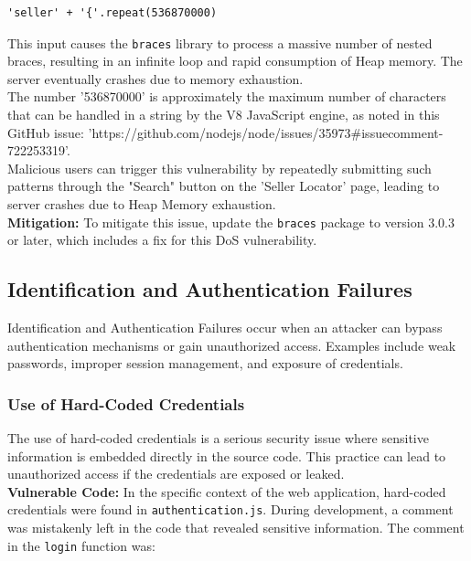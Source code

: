\documentclass[]{article}
\begin{document}
\begin{lstlisting}
'seller' + '{'.repeat(536870000)
\end{lstlisting}
This input causes the \texttt{braces} library to process a massive number of nested braces, resulting in an infinite loop and rapid consumption of Heap memory. The server eventually crashes due to memory exhaustion. \\ 
The number '536870000' is approximately the maximum number of characters that can be handled in a string by the V8 JavaScript engine, as noted in this GitHub issue: \footnotesize 'https://github.com/nodejs/node/issues/35973\#issuecomment-722253319'.\\
\normalsize
Malicious users can trigger this vulnerability by repeatedly submitting such patterns through the "Search" button on the 'Seller Locator' page, leading to server crashes due to Heap Memory exhaustion. \\ 
\textbf{Mitigation:}
To mitigate this issue, update the \texttt{braces} package to version 3.0.3 or later, which includes a fix for this DoS vulnerability.

\subsection{Identification and Authentication Failures}

Identification and Authentication Failures occur when an attacker can bypass authentication mechanisms or gain unauthorized access. Examples include weak passwords, improper session management, and exposure of credentials.

\subsubsection{Use of Hard-Coded Credentials}

The use of hard-coded credentials is a serious security issue where sensitive information is embedded directly in the source code. This practice can lead to unauthorized access if the credentials are exposed or leaked. \\
\textbf{Vulnerable Code:}
In the specific context of the web application, hard-coded credentials were found in \texttt{authentication.js}. During development, a comment was mistakenly left in the code that revealed sensitive information. The comment in the \texttt{login} function was:
\end{document}
